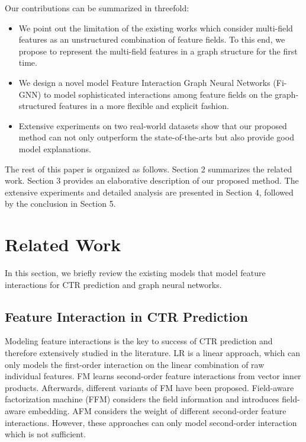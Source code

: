 \documentclass[sigconf]{acmart}
\begin{document}
Our contributions can be summarized in threefold:
\begin{itemize}
\item 
We point out the limitation of the existing works which consider multi-field features as an unstructured combination of feature fields.
To this end, we propose to represent the multi-field features in a graph structure for the first time.  
\item We design a novel model Feature Interaction Graph Neural Networks (Fi-GNN) to model sophisticated interactions among feature fields on the graph-structured features in a more flexible and explicit fashion.
\item Extensive experiments on two real-world datasets show that our proposed method can not only outperform the state-of-the-arts but also provide good model explanations. 
\end{itemize}

The rest of this paper is organized as follows. 
Section 2 summarizes the related work.
Section 3 provides an elaborative description of our proposed method.
The extensive experiments and detailed analysis are presented in Section 4, followed by the conclusion in Section 5.


\section{Related Work}
In this section, we briefly review the existing models that model feature interactions for CTR prediction and graph neural networks.
\subsection{Feature Interaction in CTR Prediction} \label{sect:related}
Modeling feature interactions is the key to success of CTR prediction and therefore extensively studied in the literature.
LR is a linear approach, which can only models the first-order interaction on the linear combination of raw individual features.
FM \cite{rendle2010factorization} learns second-order feature interactions from vector inner products. 
Afterwards, different variants of FM have been proposed.
Field-aware factorization machine (FFM) \cite{juan2016field} considers the field information and introduces field-aware embedding.
AFM \cite{xiao2017attentional} considers the weight of different second-order feature interactions.
However, these approaches can only model second-order interaction which is not sufficient.
\end{document}
